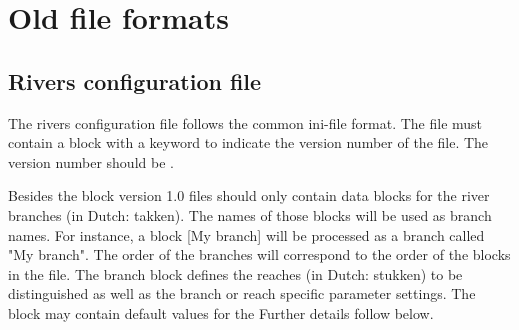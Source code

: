 \pagebreak[4]
\section{Old file formats}\label{app-v1:old-formats}

\subsection{Rivers configuration file}\label{app-v1:rivers}

The rivers configuration file follows the common ini-file format.
The file must contain a \keyw{[General]} block with a keyword  to indicate the version number of the file.
The version number should be .

Besides the \keyw{[General]} block version 1.0 files should only contain data blocks for the river branches (in Dutch: takken).
The names of those blocks will be used as branch names.
For instance, a block [My branch] will be processed as a branch called "My branch".
The order of the branches will correspond to the order of the blocks in the file.
The branch block defines the reaches (in Dutch: stukken) to be distinguished as well as the branch or reach specific parameter settings.
The \keyw{[General]} block may contain default values for the 
Further details follow below.

